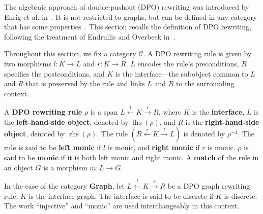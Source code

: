 The algebraic approach of double-pushout (DPO) rewriting was introduced by Ehrig et al. in~\cite{ehrig1973graph}. It is not restricted to graphs, but can be defined in any category that has some properties~\cite{ehrig2006fundamentals,lack2004adhesive}. This section recalls the definition of DPO rewriting, following the treatment of Endrullis and Overbeek in~\cite{endrullis2024generalized_icgt}.

Throughout this section,
we fix a category \( \mathcal{C} \).
 A DPO rewriting rule is given by two morphisms \(l: K \to L\) and \(r: K \to R\). \(L\) encodes the rule's preconditions, \(R\) specifies the postconditions, and \(K\) is the interface—the subobject common to \(L\) and \(R\) that is preserved by the rule and links \(L\) and \(R\) to the surrounding context.
\begin{definition} 
  \label{def:grs:dpo_rule}
A \textbf{DPO rewriting rule} $\rho$ is a span \( L \overset{l}{\leftarrow} K \overset{r}{\rightarrow} R \), where \( K \) is the \textbf{interface}, \( L \) is the \textbf{left-hand-side object}, denoted by \( \operatorname{lhs}(\rho) \), and \( R \) is the \textbf{right-hand-side object}, denoted by \( \operatorname{rhs}(\rho) \). The rule $(R \overset{r}{\leftarrow} K \overset{l}{\rightarrow} L)$ is denoted by $\rho^{-1}$. The rule is said to be \textbf{left monic} if \( l \) is monic, and \textbf{right monic} if \( r \) is monic. 
$\rho$ is said to be \textbf{monic} if it is both left monic and right monic.
A \textbf{match} of the rule in an object \( G \) is a morphism \( m: L \rightarrow G \). 
\end{definition}
In the case of the category \textbf{Graph}, 
let \( L \overset{l}{\leftarrow} K \overset{r}{\rightarrow} R \) be a DPO graph rewriting rule. $K$ is the interface graph. The interface is said to be discrete if $K$ is discrete.
The work \enquote{injective} and \enquote{monic} are used interchangeably in this context.

